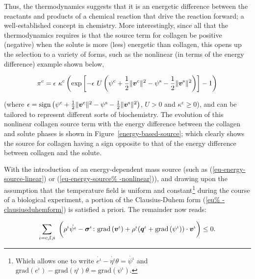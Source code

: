 Thus, the thermodynamics suggests that it is an energetic difference
between the reactants and products of a chemical reaction that drive
the reaction forward; a well-established concept in
chemistry. More interestingly, since all that the thermodynamics
requires is that the source term for collagen be positive (negative)
when the solute is more (less) energetic than collagen, this opens up
the selection to a variety of forms, such as the nonlinear (in terms
of the energy difference) example shown below,

\begin{equation}
\pi^{\mathrm{c}}=\epsilon\ \kappa^{\mathrm{c}}\left( \mathrm{exp}
\left[-\epsilon\ U \left(\psi^{\mathrm{c}}+\frac{1}{2}
  \Vert\bv^{\mathrm{c}}\Vert^2 - \psi^{\mathrm{s}} - \frac{1}{2}
  \Vert\bv^{\mathrm{s}}\Vert^2\right) \right] - 1\right)
\label{eu-energy-source-nonlinear}
\end{equation}

\noindent (where $\epsilon =
\mathrm{sign}\left(\psi^{\mathrm{c}}+\frac{1}{2}
\Vert\mbox{\boldmath$ v$}^{\mathrm{c}}\Vert^2 - \psi^{\mathrm{s}}-\frac{1}{2}
\Vert\mbox{\boldmath$ v$}^{\mathrm{s}}\Vert^2\right)$, $U>0$ and
$\kappa^{\mathrm{c}}\geq 0$), and can be tailored to represent
different sorts of biochemistry. The evolution of this nonlinear
collagen source term with the energy difference between the collagen
and solute phases is shown in Figure~\ref{energy-based-source}; which
clearly shows the source for collagen having a sign opposite to that
of the energy difference between collagen and the solute.

With the introduction of an energy-dependent mass source (such as
(\ref{eu-energy-source-linear}) or (\ref{eu-energy-source%
  -nonlinear})), and drawing upon the assumption that the temperature
field is uniform and constant\footnote{Which allows one to write
  $\dot{e^{\iota}} - \dot{\eta^{\iota}} \theta = \dot{\psi^{\iota}}$
  and $\mathrm{grad} \left(e^{\iota}\right) -
  \mathrm{grad}\left(\eta^{\iota} \right)\theta =
  \mathrm{grad}\left(\psi^{\iota} \right)$.} during the course of a
biological experiment, a portion of the Clausius-Duhem form (\ref{eu%
  -clausiusduhemform}) is satisfied a priori. The remainder now reads:

\begin{equation}
\sum\limits_{\iota=\mathrm{c},\mathrm{f},\mathrm{s}}\ \bigg(\rho^{\iota}
\dot{\psi^{\iota}}
-\Bsigma^{\iota}\colon\mathrm{grad}\left(\bv^{\iota}\right)+
\rho^{\iota} (\bq^{\iota}+\mathrm{grad}\left(\psi^{\iota}\right))
\cdot\bv^{\iota} \bigg) \leq 0.
\label{eu-reduced-dissipation-1}
\end{equation}

